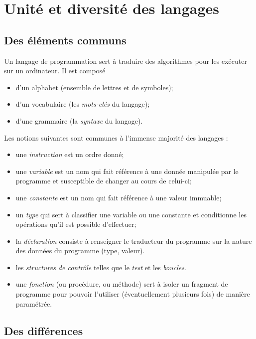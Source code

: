 \chapter{Unité et diversité des langages}

\section{Des éléments communs}
Un langage de programmation sert à traduire des algorithmes pour les exécuter sur un ordinateur. Il est composé 
\begin{itemize}
    \item   d'un alphabet (ensemble de lettres et de symboles);
    \item   d'un vocabulaire (les \textit{mots-clés} du langage);
    \item   d'une grammaire (la \textit{syntaxe} du langage).
\end{itemize}

Les notions suivantes sont communes à l'immense majorité des langages :

\begin{itemize}
    \item   une \textit{instruction} est un ordre donné;
    \item   une \textit{variable} est un nom qui fait référence à une donnée manipulée par le programme et susceptible de changer au cours de celui-ci;
    \item   une \textit{constante} est un nom qui fait référence à une valeur immuable;
    \item   un \textit{type} qui sert à classifier une variable ou une constante et conditionne les opérations qu'il est possible d'effectuer;
    \item   la \textit{déclaration} consiste à renseigner le traducteur du programme sur la nature des données du programme (type, valeur).
    \item   les \textit{structures de contrôle} telles que le \textit{test} et les \textit{boucles}.
    \item   une \textit{fonction} (ou procédure, ou méthode) sert à isoler un fragment de programme pour pouvoir l'utiliser (éventuellement plusieurs fois) de manière paramétrée.
\end{itemize}

\section{Des différences}

